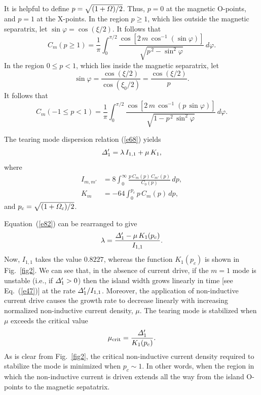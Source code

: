 \documentclass[12pt,prb,aps]{revtex4-1}
\begin{document}
It is helpful to define $p = \sqrt{(1+{\mit\Omega})/2}$. Thus, $p=0$ at the magnetic O-points, and $p=1$ at the
X-points. In the region $p\geq1$, which lies outside the magnetic separatrix, let $\sin\varphi = \cos(\xi/2)$. 
It follows that 
\begin{equation}
 C_m(p\geq 1)=\frac{1}{\pi} \int_{0}^{\pi/2}\frac{\cos[2\,m\,\cos^{-1}(\sin\varphi)]}
 {\sqrt{p^{\,2}-\sin^2\varphi}}\,d\varphi.
\end{equation}
In the region $0\leq p< 1$, which lies inside the magnetic separatrix, let 
\begin{equation}
\sin\varphi = \frac{\cos(\xi/2)}{\cos(\xi_0/2)}=\frac{\cos(\xi/2)}{p}.
\end{equation}
 It follows that 
\begin{equation}
 C_m(-1\leq p< 1)=\frac{1}{\pi} \int_{0}^{\pi/2}\frac{\cos[2\,m\,\cos^{-1}(p\,\sin\varphi)]}
 {\sqrt{1-p^{\,2}\,\sin^2\varphi}}\,d\varphi.
\end{equation}


The tearing mode dispersion relation (\ref{e68}) yields
\begin{equation}\label{e82}
{\mit\Delta}_1' = \lambda\,I_{1,1}+\mu\,K_1,
\end{equation}
where
\begin{align}
I_{m,m'} &= 8\int_0^\infty\frac{p\,C_m(p)\,C_{m'}(p)}{C_0(p)}\,dp,\\[0.5ex]
K_m &= -64 \int_0^{p_c} p\,C_m(p)\,dp,
\end{align}
and $p_c= \sqrt{(1+{\mit\Omega}_c)/2}$. 

Equation~(\ref{e82}) can be rearranged to give
\begin{equation}
\lambda = \frac{{\mit\Delta}_1'-\mu\,K_1(p_c)}{I_{1,1}}.
\end{equation}
Now, $I_{1,1}$ takes the value $0.8227$, whereas the function $K_1(p_c)$ is shown in Fig.~\ref{fig2}. 
We can see that, in the absence of current drive, if the $m=1$ mode is unstable (i.e., if ${\mit\Delta}_1'> 0$) then the island width grows linearly in time  [see Eq.~(\ref{e47})] at the rate ${\mit\Delta}_1'/I_{1,1}$.\cite{ruth}
Moreover, the application of non-inductive current drive causes the growth rate to decrease linearly with
increasing normalized non-inductive current density, $\mu$. The tearing mode is stabilized when $\mu$ exceeds the critical value
\begin{equation}
\mu_{\rm crit} =\frac{{\mit\Delta}_1'}{K_1(p_c)}.
\end{equation}
As is clear from Fig.~\ref{fig2}, the critical non-inductive current density required to stabilize the mode is minimized when $p_c\sim 1$. In other words, when the region in which the non-inductive current is driven extends all the way from the island O-points to the magnetic sepatatrix.
\end{document}
